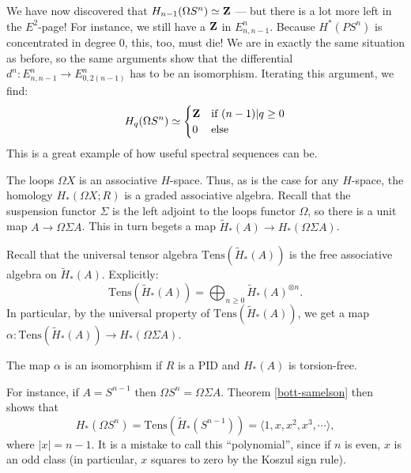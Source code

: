 We have now discovered that $H_{n-1}(\Omega S^n) \simeq \mathbf Z$ --- but there is a
lot more left in the $E^2$-page! For instance, we still have a $\mathbf Z$ in
$E^n_{n,n-1}$. Because $H^\ast(PS^n)$ is concentrated in degree $0$, this, too,
must die! We are in exactly the same situation as before, so the same arguments
show that the differential $d^n:E^n_{n,n-1}\to E^n_{0,2(n-1)}$ has to be an
isomorphism. Iterating this argument, we find:
\begin{equation*}
    H_q(\Omega S^n) \simeq \begin{cases}
        \mathbf Z & \text{if }(n-1)|q\geq 0\\
        0 & \text{else}
    \end{cases}
\end{equation*}
This is a great example of how useful spectral sequences can be.
\begin{remark}
    The loops $\Omega X$ is an associative $H$-space. Thus, as is the case for
    any $H$-space, the homology $H_\ast(\Omega X; R)$ is a graded associative
    algebra. Recall that the suspension functor $\Sigma$ is the left adjoint to
    the loops functor $\Omega$, so there is a unit map $A\to \Omega \Sigma A$.
    This in turn begets a map $\widetilde{H}_\ast(A)\to H_\ast(\Omega \Sigma A)$.
    
    Recall that the universal tensor algebra
    $\mathrm{Tens}(\widetilde{H}_\ast(A))$ is the free associative algebra on
    $\widetilde{H}_\ast(A)$. Explicitly:
    $$\mathrm{Tens}(\widetilde{H}_\ast(A)) = \bigoplus_{n\geq
    0}\widetilde{H}_\ast(A)^{\otimes n}.$$
    In particular, by the universal property of
    $\mathrm{Tens}(\widetilde{H}_\ast(A))$, we get a map
    $\alpha:\mathrm{Tens}(\widetilde{H}_\ast(A))\to H_\ast(\Omega \Sigma A)$.
    \begin{theorem}\label{bott-samelson}
	The map $\alpha$ is an isomorphism if $R$ is a PID and $H_\ast(A)$ is
	torsion-free.
    \end{theorem}
    For instance, if $A = S^{n-1}$ then $\Omega S^n = \Omega \Sigma A$. Theorem
    \ref{bott-samelson} then shows that
    $$
    H_\ast(\Omega S^n) = \mathrm{Tens}(\widetilde{H}_\ast(S^{n-1})) = \langle
    1, x, x^2, x^3, \cdots\rangle,
    $$
    where $|x| = n-1$. It is a mistake to call this ``polynomial'', since if
    $n$ is even, $x$ is an odd class (in particular, $x$ squares to zero by the
    Koszul sign rule).
\end{remark}

